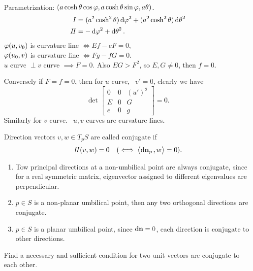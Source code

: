 \begin{example}[Catenoid]\hfill\\
    Parametrization: \((a\cosh\theta\cos\varphi,a\cosh\theta\sin\varphi,a\theta)\).
    \begin{align*}
        I&=(a^2\cosh^2\theta)\dd{\varphi}^2+(a^2\cosh^2\theta)\dd{\theta}^2 \\
        I\!I&=-\dd{\varphi}^2+\dd{\theta}^2
    .\end{align*}
    \(\varphi(u,v_0)\) is curvature line \(\iff Ef-eF=0\), \\
    \(\varphi(u_0,v)\) is curvature line \(\iff Fg-fG=0\). \\
    \(u\) curve \(\perp v\) curve \(\implies F=0\). Also \(EG>F^2\), so \(E,G\neq 
    0\), then \(f=0\).

    Conversely if \(F=f=0\), then for \(u\) curve, \ie\ \(v'= 0\),
    clearly we have \[
        \det\begin{bmatrix}
            0 & 0 & (u')^2 \\
            E & 0 & G \\
            e & 0 & g
        \end{bmatrix}=0
    .\] Similarly for \(v\) curve. \ie\ \(u,v\) curves are curvature lines.
\end{example}

\begin{definition}
    Direction vectors \(v,w\in T_p S\) are called conjugate if \[
        I\!I(v,w)=0 \quad (\iff \left<\dd{\vb{n}}_p,w\right> =0)
    .\] 
\end{definition}
\begin{example}
\begin{enumerate}[(1)]
    \item 
    Tow principal directions at a non-umbilical point are always conjugate,
    since for a real symmetric matrix, eigenvector assigned to different
    eigenvalues are perpendicular.
    \item 
    \(p\in S\) is a non-planar umbilical point, then any two orthogonal directions
    are conjugate.
    \item 
    \(p\in S\) is a planar umbilical point, since \(\dd{\vb{n}}=0\), each direction
    is conjugate to other directions.
\end{enumerate}
\end{example}

\begin{exercise}
    Find a necessary and sufficient condition for two unit vectors are conjugate
    to each other.
\end{exercise}

